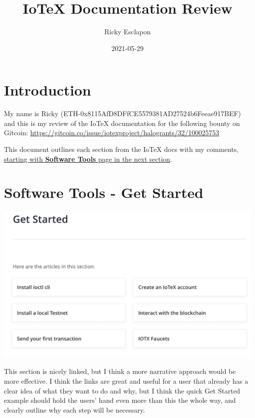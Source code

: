 \documentclass[
]{book}
\title{IoTeX Documentation Review}
\author{Ricky Esclapon}
\date{2021-05-29}
\begin{document}
\frontmatter
\maketitle

\mainmatter
\hypertarget{introduction}{%
\chapter{Introduction}\label{introduction}}

My name is Ricky (ETH-0x8115AfD8DFfCE5579381AD27524b6Feeae917BEF) and
this is my review of the IoTeX documentation for the following bounty on
Gitcoin:
\url{https://gitcoin.co/issue/iotexproject/halogrants/32/100025753}

This document outlines each section from the IoTeX docs with my
comments, \protect\hyperlink{the-internet-of-trusted-things}{starting
with \textbf{Software Tools} page in the next section}.

\hypertarget{software-tools---get-started}{%
\chapter{Software Tools - Get
Started}\label{software-tools---get-started}}

\includegraphics{images/get_started.jpg}

This section is nicely linked, but I think a more narrative approach
would be more effective. I think the links are great and useful for a
user that already has a clear idea of what they want to do and why, but
I think the quick Get Started example should hold the users' hand even
more than this the whole way, and clearly outline why each step will be
necessary.
\end{document}
